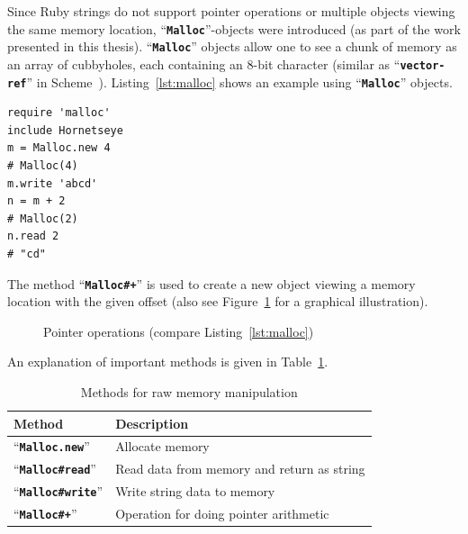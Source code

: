 \documentclass[12pt,a4paper,oneside,openright]{book}
\newcommand{\fig}[1]{Figure~\ref{fig:#1}}
\newcommand{\tbl}[1]{Table~\ref{tbl:#1}}
\newcommand{\lst}[1]{Listing~\ref{lst:#1}}
\newcommand{\code}[1]{``\texttt{\textbf{\textcolor{codegray}{\small{#1}}}}''}
\begin{document}
\begin{CJK}{UTF8}{}
Since Ruby strings do not support pointer operations or multiple objects viewing the same memory location, \code{Malloc}-objects were introduced (as part of the work presented in this thesis). \code{Malloc} objects allow one to see a chunk of memory as an array of cubbyholes, each containing an 8-bit character (similar as \code{vector-ref} in Scheme~\citep{abelson1996structure}). \lst{malloc} shows an example using \code{Malloc} objects.
\lstset{language=Ruby,frame=single,numbers=none}
\begin{lstlisting}[float=htbp,caption={Manipulating raw data with Malloc objects},label=lst:malloc]
require 'malloc'
include Hornetseye
m = Malloc.new 4
# Malloc(4)
m.write 'abcd'
n = m + 2
# Malloc(2)
n.read 2
# "cd"
\end{lstlisting}
The method \code{Malloc\#+} is used to create a new object viewing a memory location with the given offset (also see \fig{memory} for a graphical illustration).
\begin{figure}[htbp]
  \begin{center}
    \caption{Pointer operations (compare \lst{malloc})\label{fig:memory}}
  \end{center}
\end{figure}
An explanation of important methods is given in \tbl{malloc}.
\begin{table}[htbp]
  \begin{center}
    \caption{Methods for raw memory manipulation\label{tbl:malloc}}\vspace{1em}
    \begin{tabular}{ll}\toprule
      \textbf{Method} & \textbf{Description} \\\midrule
      \code{Malloc.new} & Allocate memory \\
      \code{Malloc\#read} & Read data from memory and return as string\\
      \code{Malloc\#write} & Write string data to memory\\
      \code{Malloc\#+} & Operation for doing pointer arithmetic\\\bottomrule
    \end{tabular}
  \end{center}
\end{table}


\end{CJK}
\end{document}
